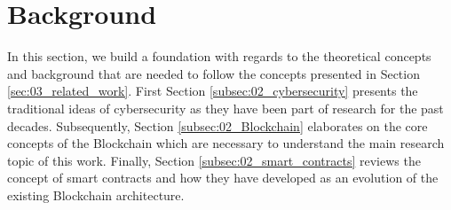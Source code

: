 \section{Background}
\label{sec:02_background}

In this section, we build a foundation with regards to the theoretical concepts and background that are needed to follow the concepts presented in Section \ref{sec:03_related_work}. First Section \ref{subsec:02_cybersecurity} presents the traditional ideas of cybersecurity as they have been part of research for the past decades. Subsequently, Section \ref{subsec:02_Blockchain} elaborates on the core concepts of the Blockchain which are necessary to understand the main research topic of this work. Finally, Section \ref{subsec:02_smart_contracts} reviews the concept of smart contracts and how they have developed as an evolution of the existing Blockchain architecture.




